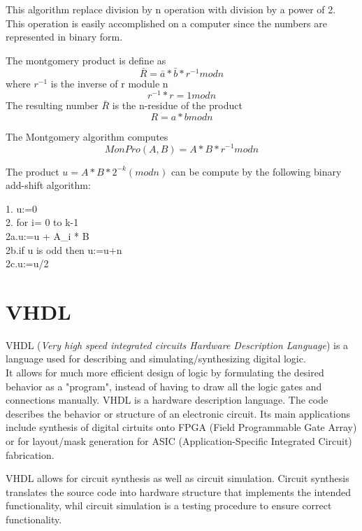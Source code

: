 This algorithm replace division by n operation with division by a power of 2. This operation is easily accomplished on a computer since the numbers are represented in binary form\cite{highspeedrsa}.

The montgomery product is define as
\begin{equation}
    \bar{R}= \bar{a} * \bar{b} * r^{-1} mod n
\end{equation}
where $r^{-1}$ is the inverse of r module n
\begin{equation}
    r^{-1}*r = 1 mod n
\end{equation}
The resulting number $\bar{R}$ is the n-residue of the product
\begin{equation}
    R= a * b mod n
\end{equation}

The Montgomery algorithm computes
\begin{equation}
    MonPro(A,B) = A * B * r^{-1}mod n
\end{equation}

The product $u = A * B * 2^{-k}(mod n)$ can be compute by the following binary add-shift algorithm:
\begin{algorithm}

    1. u:=0\\
    2. for i= 0 to k-1\\
    2a.\quad u:=u + A_i * B\\
    2b.\quad if u is odd then u:=u+n\\
    2c.\quad u:=u/2\\
\end{algorithm}


\section{VHDL}
VHDL (\emph{Very high speed integrated circuits Hardware Description Language}) is a language used for describing and simulating/synthesizing digital logic.\\
It allows for much more efficient design of logic by formulating the desired behavior as a "program", instead of having to draw all the logic gates and connections manually.
VHDL is a hardware description language. The code describes the behavior or structure of an electronic circuit\cite{pedroni}. Its main applications include synthesis of digital cirtuits onto FPGA (Field Programmable Gate Array) or for layout/mask generation for ASIC (Application-Specific Integrated Circuit) fabrication.

VHDL allows for circuit synthesis as well as circuit simulation. Circuit synthesis translates the source code into hardware structure that implements the intended functionality, whil circuit simulation is a testing procedure to ensure correct functionality. 